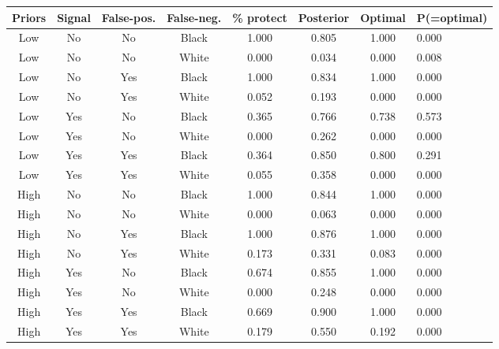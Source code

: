 \begin{table}[H]\centering \scriptsize \begin{tabular}{ccccccc} \hline \hline
\textbf{Priors}&\textbf{Signal}&\textbf{False-pos.}&\textbf{False-neg.}&\textbf{\% protect}& \textbf{Posterior} & \textbf{Optimal} & \textbf{P(=optimal)} \\ \hline
Low&No&No&Black&1.000&0.805&1.000&0.000\\
Low&No&No&White&0.000&0.034&0.000&0.008\\
Low&No&Yes&Black&1.000&0.834&1.000&0.000\\
Low&No&Yes&White&0.052&0.193&0.000&0.000\\
Low&Yes&No&Black&0.365&0.766&0.738&0.573\\
Low&Yes&No&White&0.000&0.262&0.000&0.000\\
Low&Yes&Yes&Black&0.364&0.850&0.800&0.291\\
Low&Yes&Yes&White&0.055&0.358&0.000&0.000\\
High&No&No&Black&1.000&0.844&1.000&0.000\\
High&No&No&White&0.000&0.063&0.000&0.000\\
High&No&Yes&Black&1.000&0.876&1.000&0.000\\
High&No&Yes&White&0.173&0.331&0.083&0.000\\
High&Yes&No&Black&0.674&0.855&1.000&0.000\\
High&Yes&No&White&0.000&0.248&0.000&0.000\\
High&Yes&Yes&Black&0.669&0.900&1.000&0.000\\
High&Yes&Yes&White&0.179&0.550&0.192&0.000\\
\hline \end{tabular} \end{table}
